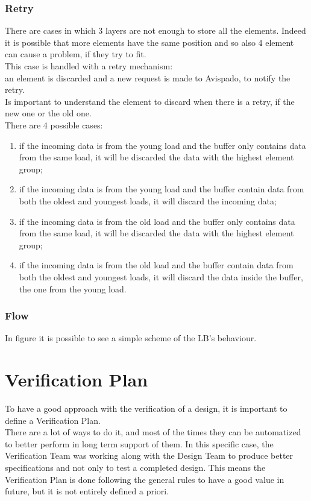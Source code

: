 \subsubsection{Retry}
There are cases in which 3 layers are not enough to store all the elements. Indeed it is possible that more elements have the same position and so also 4 element can cause a problem, if they try to fit.\\

This case is handled with a retry mechanism:\\
an element is discarded and a new request is made to Avispado, to  notify the retry.\\

Is important to understand the element to discard when there is a retry, if the new one or the old one.\\

There are 4 possible cases:
\begin{enumerate}
    \item if the incoming data is from the young load and the buffer only contains data from the same load, it will be discarded the data with the highest element group;
    
    \item if the incoming data is from the young load and the buffer contain data from both the oldest and youngest loads, it will discard the incoming data;
    
    \item if the incoming data is from the old load and the buffer only contains data from the same load, it will be discarded the data with the highest element group;
    
    \item if the incoming data is from the old load and the buffer contain data from both the oldest and youngest loads, it will discard the data inside the buffer, the one from the young load.
\end{enumerate}



\subsubsection{Flow}
In figure 
it is possible to see a simple scheme of the LB's behaviour.

\section{Verification Plan}
To have a good approach with the verification of a design, it is important to define a Verification Plan.\\
There are a lot of ways to do it, and most of the times they can be automatized to better perform in long term support of them. In this specific case, the Verification Team was working along with the Design Team to produce better specifications and not only to test a completed design. This means the Verification Plan is done following the general rules to have a good value in future, but it is not entirely defined a priori.\\

